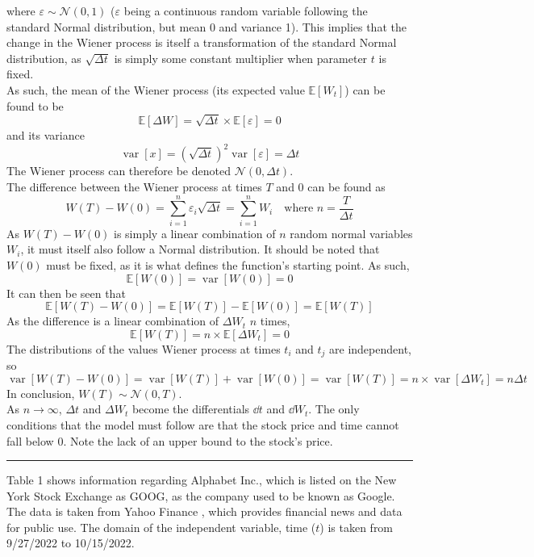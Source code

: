 \documentclass[12pt, A4]{report}
\newcommand{\Exp}{\mathbb{E}}
\newcommand{\ndist}{\mathcal{N}}
\DeclareMathOperator{\vari}{var}
\begin{document}
		where \(\varepsilon \sim \ndist(0, 1)\) (\(\varepsilon\) being a continuous random variable following the standard Normal distribution, but mean 0 and variance 1). This implies that the change in the Wiener process is itself a transformation of the standard Normal distribution, as \(\sqrt{\Delta t}\) is simply some constant multiplier when parameter \(t\) is fixed. \\
		As such, the mean of the Wiener process (its expected value \(\Exp[W_t]\)) can be found to be
			\[\Exp[\Delta W] = \sqrt{\Delta t} \times \Exp[\varepsilon] = 0\]
		and its variance
			\[\vari[x] = \left(\sqrt{\Delta t}\right)^2\vari[\varepsilon] = \Delta t\]
		The Wiener process can therefore be denoted \(\ndist(0, \Delta t)\). \\
		The difference between the Wiener process at times \(T\) and 0 can be found as
		\[W(T) - W(0) = \sum_{i = 1}^n \varepsilon_i\sqrt{\Delta t} = \sum_{i = 1}^n W_i \quad \text{where } n = \frac{T}{\Delta t} \]
		As \(W(T) - W(0)\) is simply a linear combination of \(n\) random normal variables \(W_i\), it must itself also follow a Normal distribution. It should be noted that \(W(0)\) must be fixed, as it is what defines the function's starting point. As such,
		\[\Exp[W(0)] = \vari[W(0)] = 0\]
 		It can then be seen that
 		\[\Exp[W(T) - W(0)] = \Exp[W(T)] - \Exp[W(0)] = \Exp[W(T)]\]
 		As the difference is a linear combination of \(\Delta W_t\) \(n\) times,
 			\[\Exp[W(T)] = n \times \Exp[\Delta W_t] = 0\]
 		The distributions of the values Wiener process at times \(t_i\) and \(t_j\) are independent, so
 			\[\vari[W(T) - W(0)] = \vari[W(T)] + \vari[W(0)] = \vari[W(T)] = n \times \vari[\Delta W_t] = n\Delta t\]
 		In conclusion, \(W(T) \sim \ndist(0, T)\). \\
		 As \(n \to \infty\), \(\Delta t\) and \(\Delta W_t\) become the differentials \(\dd{t}\) and \(\dd{W_t}\).
	The only conditions that the model must follow are that the stock price and time cannot fall below 0. Note the lack of an upper bound to the stock's price.
	\par\noindent\rule{\textwidth}{0.5mm}
	Table 1 shows information regarding Alphabet Inc., which is listed on the New York Stock Exchange as GOOG, as the company used to be known as Google. The data is taken from Yahoo Finance \cite{Yahoo}, which provides financial news and data for public use. The domain of the independent variable, time (\(t\)) is taken from 9/27/2022 to 10/15/2022.
\end{document}
